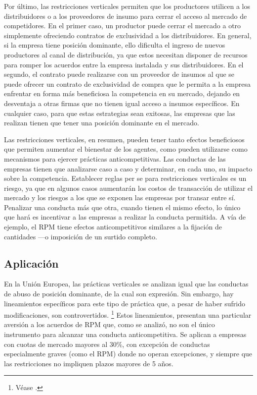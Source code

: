 \documentclass[
  12pt,
  spanish,
]{book}
\begin{document}
Por último, las restricciones verticales permiten que los productores utilicen a los distribuidores o a los proveedores de insumo para cerrar el acceso al mercado de competidores. En el primer caso, un productor puede cerrar el mercado a otro simplemente ofreciendo contratos de exclusividad a los distribuidores. En general, si la empresa tiene posición dominante, ello dificulta el ingreso de nuevos productores al canal de distribución, ya que estos necesitan disponer de recursos para romper los acuerdos entre la empresa instalada y sus distribuidores. En el segundo, el contrato puede realizarse con un proveedor de insumos al que se puede ofrecer un contrato de exclusividad de compra que le permita a la empresa enfrentar en forma más beneficiosa la competencia en su mercado, dejando en desventaja a otras firmas que no tienen igual acceso a insumos específicos. En cualquier caso, para que estas estrategias sean exitosas, las empresas que las realizan tienen que tener una posición dominante en el mercado.

Las restricciones verticales, en resumen, pueden tener tanto efectos beneficiosos que permiten aumentar el bienestar de los agentes, como pueden utilizarse como mecanismos para ejercer prácticas anticompetitivas. Las conductas de las empresas tienen que analizarse caso a caso y determinar, en cada uno, su impacto sobre la competencia. Establecer reglas per se para restricciones verticales es un riesgo, ya que en algunos casos aumentarán los costos de transacción de utilizar el mercado y los riesgos a los que se exponen las empresas por transar entre sí. Penalizar una conducta más que otra, cuando tienen el mismo efecto, lo único que hará es incentivar a las empresas a realizar la conducta permitida. A vía de ejemplo, el RPM tiene efectos anticompetitivos similares a la fijación de cantidades ---o imposición de un surtido completo.

\hypertarget{aplicaciuxf3n-1}{%
\subsection{Aplicación}\label{aplicaciuxf3n-1}}

En la Unión Europea, las prácticas verticales se analizan igual que las conductas de abuso de posición dominante, de la cual son expresión. Sin embargo, hay lineamientos específicos para este tipo de práctica que, a pesar de haber sufrido modificaciones, son controvertidos.
\footnote{Véase \citet{UE2010}.}
Estos lineamientos, presentan una particular aversión a los acuerdos de RPM que, como se analizó, no son el único instrumento para alcanzar una conducta anticompetitiva. Se aplican a empresas con cuotas de mercado mayores al 30\%, con excepción de conductas especialmente graves (como el RPM) donde no operan excepciones, y siempre que las restricciones no impliquen plazos mayores de 5 años.
\end{document}
